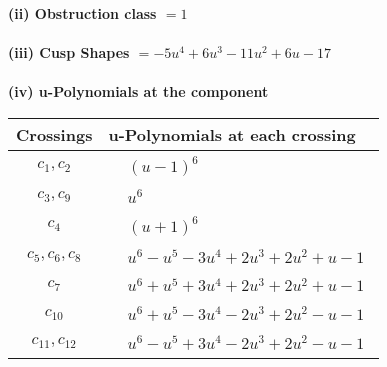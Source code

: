 \documentclass[1p]{elsarticle_modified}
\theoremstyle{definition}
\begin{document}
\flushleft \textbf{(ii) Obstruction class $= 1$}\\~\\
\flushleft \textbf{(iii) Cusp Shapes $= -5 u^4+6 u^3-11 u^2+6 u-17$}\\~\\
\newpage\renewcommand{\arraystretch}{1}
\flushleft \textbf{(iv) u-Polynomials at the component}\newline \\
\begin{tabular}{m{50pt}|m{274pt}}
Crossings & \hspace{64pt}u-Polynomials at each crossing \\
\hline $$\begin{aligned}c_{1},c_{2}\end{aligned}$$&$\begin{aligned}
&(u-1)^6
\end{aligned}$\\
\hline $$\begin{aligned}c_{3},c_{9}\end{aligned}$$&$\begin{aligned}
&u^6
\end{aligned}$\\
\hline $$\begin{aligned}c_{4}\end{aligned}$$&$\begin{aligned}
&(u+1)^6
\end{aligned}$\\
\hline $$\begin{aligned}c_{5},c_{6},c_{8}\end{aligned}$$&$\begin{aligned}
&u^6- u^5-3 u^4+2 u^3+2 u^2+u-1
\end{aligned}$\\
\hline $$\begin{aligned}c_{7}\end{aligned}$$&$\begin{aligned}
&u^6+u^5+3 u^4+2 u^3+2 u^2+u-1
\end{aligned}$\\
\hline $$\begin{aligned}c_{10}\end{aligned}$$&$\begin{aligned}
&u^6+u^5-3 u^4-2 u^3+2 u^2- u-1
\end{aligned}$\\
\hline $$\begin{aligned}c_{11},c_{12}\end{aligned}$$&$\begin{aligned}
&u^6- u^5+3 u^4-2 u^3+2 u^2- u-1
\end{aligned}$\\
\hline
\end{tabular}\\~\\
\end{document}
